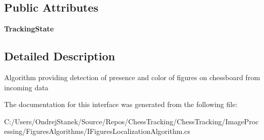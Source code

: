 \subsection*{Public Attributes}
\begin{DoxyCompactItemize}
\item 
\mbox{\label{interface_chess_tracking_1_1_image_processing_1_1_figures_algorithms_1_1_i_figures_localization_algorithm_a656b191087f2b502e88b28d7e4329c38}} 
{\bfseries Tracking\+State}
\end{DoxyCompactItemize}


\subsection{Detailed Description}
Algorithm providing detection of presence and color of figures on chessboard from incoming data 



The documentation for this interface was generated from the following file\+:\begin{DoxyCompactItemize}
\item 
C\+:/\+Users/\+Ondrej\+Stanek/\+Source/\+Repos/\+Chess\+Tracking/\+Chess\+Tracking/\+Image\+Processing/\+Figures\+Algorithms/I\+Figures\+Localization\+Algorithm.\+cs\end{DoxyCompactItemize}
